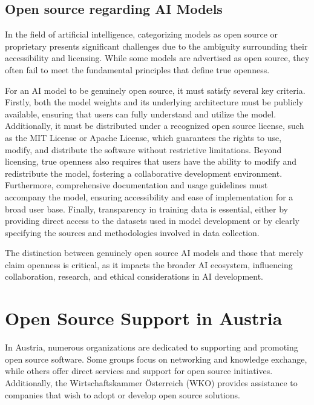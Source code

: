 \subsection{Open source regarding AI Models}
\label{sec:Open_source_AI_Models}

In the field of artificial intelligence, categorizing models as open source or proprietary presents significant challenges due to the ambiguity surrounding their accessibility and licensing. While some models are advertised as open source, they often fail to meet the fundamental principles that define true openness.  

For an AI model to be genuinely open source, it must satisfy several key criteria. Firstly, both the model weights and its underlying architecture must be publicly available, ensuring that users can fully understand and utilize the model. Additionally, it must be distributed under a recognized open source license, such as the MIT License or Apache License, which guarantees the rights to use, modify, and distribute the software without restrictive limitations. Beyond licensing, true openness also requires that users have the ability to modify and redistribute the model, fostering a collaborative development environment. Furthermore, comprehensive documentation and usage guidelines must accompany the model, ensuring accessibility and ease of implementation for a broad user base. Finally, transparency in training data is essential, either by providing direct access to the datasets used in model development or by clearly specifying the sources and methodologies involved in data collection.  

The distinction between genuinely open source AI models and those that merely claim openness is critical, as it impacts the broader AI ecosystem, influencing collaboration, research, and ethical considerations in AI development.


\section{Open Source Support in Austria}

In Austria, numerous organizations are dedicated to supporting and promoting open source software. 
Some groups focus on networking and knowledge exchange, while others offer direct services and support for open source initiatives. 
Additionally, the Wirtschaftskammer Österreich (WKO) provides assistance to companies that wish to adopt or develop open source solutions.

